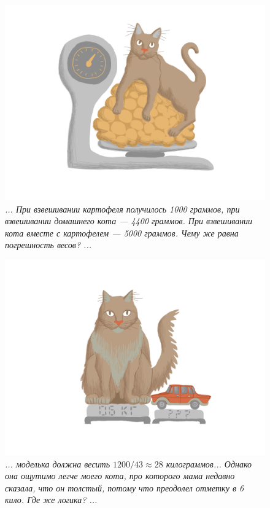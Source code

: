 \documentclass[10pt]{scrbook} \usepackage{modules/nonstahp_book}
\begin{document}
\begin{figure} \begin{center}
	\includegraphics[width=14cm]{figures/color/02}
	\caption{
             {\itshape ... При взвешивании картофеля получилось 1000 граммов, при 
             взвешивании домашнего кота — 4400 граммов. При взвешивании кота вместе 
             с картофелем --- 5000 граммов. Чему же равна погрешность весов? ...}\\
             }
\end{center} \end{figure}

\begin{figure} \begin{center}
	\includegraphics[width=14cm]{figures/color/03}
	\caption{
             {\itshape ... моделька должна весить $1200 / 43 \approx 28$ килограммов... 
             Однако она ощутимо легче моего кота, про которого мама недавно сказала, 
             что он толстый, потому что преодолел отметку в 6 кило. Где же логика? ...}\\
             }
\end{center} \end{figure}
\end{document}
